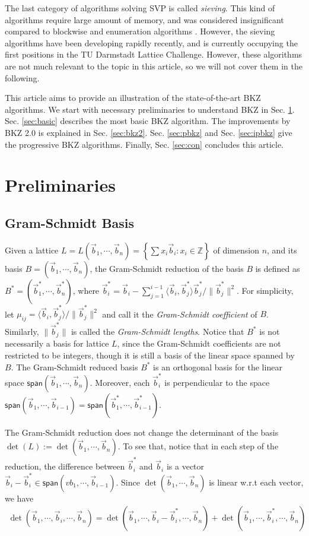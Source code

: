 \documentclass[11pt]{article}
\newcommand{\bbZ}{\mathbb{Z}}
\newcommand{\vb}{\vec{b}}
\newcommand{\sspan}{\mathsf{span}}
\begin{document}
The last category of algorithms solving SVP is called \emph{sieving}.
This kind of algorithms require large amount of memory, and was considered insignificant compared to blockwise and enumeration algorithms \cite{gnr2010lattice}.
However, the sieving algorithms have been developing rapidly recently, and is currently occupying the first positions in the TU Darmstadt Lattice Challenge.
However, these algorithms are not much relevant to the topic in this article, so we will not cover them in the following.

This article aims to provide an illustration of the state-of-the-art BKZ algorithms.
We start with necessary preliminaries to understand BKZ in Sec. \ref{sec:pre}.
Sec. \ref{sec:basic} describes the most basic BKZ algorithm.
The improvements by BKZ 2.0 is explained in Sec. \ref{sec:bkz2}.
Sec. \ref{sec:pbkz} and Sec. \ref{sec:ipbkz} give the progressive BKZ algorithms.
Finally, Sec. \ref{sec:con} concludes this article.

\section{Preliminaries}
\label{sec:pre}

\subsection{Gram-Schmidt Basis}

Given a lattice $L=L(\vb_1,\cdots,\vb_n)=\left\{\sum x_i\vb_i:x_i\in\bbZ\right\}$ of dimension $n$, and its basis $B=(\vb_1,\cdots,\vb_n)$, the Gram-Schmidt reduction of the basis $B$ is defined as $B^*=(\vb_1^*,\cdots,\vb_n^*)$, where $\vb_i^*=\vb_i-\sum_{j=1}^{i-1}\langle\vb_i,\vb_j^*\rangle\vb_j^*/\|\vb_j^*\|^2$.
For simplicity, let $\mu_{ij}=\langle\vb_i,\vb_j^*\rangle/\|\vb_j^*\|^2$ and call it the \emph{Gram-Schmidt coefficient} of $B$.
Similarly, $\|\vb_j^*\|$ is called the \emph{Gram-Schmidt lengths}.
Notice that $B^*$ is not necessarily a basis for lattice $L$, since the Gram-Schmidt coefficients are not restricted to be integers, though it is still a basis of the linear space spanned by $B$.
The Gram-Schmidt reduced basis $B^*$ is an orthogonal basis for the linear space $\sspan(\vb_1,\cdots,\vb_n)$.
Moreover, each $\vb_i^*$ is perpendicular to the space $\sspan(\vb_1,\cdots,\vb_{i-1})=\sspan(\vb_1^*,\cdots,\vb_{i-1}^*)$.

The Gram-Schmidt reduction does not change the determinant of the basis $\det(L):=\det(\vb_1,\cdots,\vb_n)$.
To see that, notice that in each step of the reduction, the difference between $\vb_i^*$ and $\vb_i$ is a vector $\vb_i-\vb_i^* \in \sspan(vb_1,\cdots,\vb_{i-1})$.
Since $\det(\vb_1,\cdots,\vb_n)$ is linear w.r.t each vector, we have
\begin{eqnarray}
\det(\vb_1,\cdots,\vb_i,\cdots,\vb_n)=\det(\vb_1,\cdots,\vb_i-\vb_i^*,\cdots,\vb_n)+\det(\vb_1,\cdots,\vb_i^*,\cdots,\vb_n) \label{eqn:det-sum}
\end{eqnarray}
\end{document}
